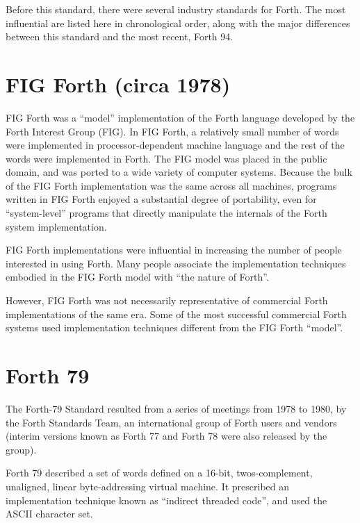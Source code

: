 \label{annex:diff}

Before this standard, there were several industry standards for Forth.
The most influential are listed here in chronological order, along
with the major differences between this standard and the most recent,
Forth 94.

\section{FIG Forth (circa 1978)} %

FIG Forth was a ``model'' implementation of the Forth language
developed by the Forth Interest Group (FIG). In FIG Forth, a
relatively small number of words were implemented in processor-dependent
machine language and the rest of the words were implemented in Forth.
The FIG model was placed in the public domain, and was ported to a wide
variety of computer systems. Because the bulk of the FIG Forth
implementation was the same across all machines, programs written in
FIG Forth enjoyed a substantial degree of portability, even for
``system-level'' programs that directly manipulate the internals
of the Forth system implementation.

FIG Forth implementations were influential in increasing the number
of people interested in using Forth. Many people associate the
implementation techniques embodied in the FIG Forth model with
``the nature of Forth''.

However, FIG Forth was not necessarily representative of commercial
Forth implementations of the same era. Some of the most successful
commercial Forth systems used implementation techniques different
from the FIG Forth ``model''.


\section{Forth 79} %

The Forth-79 Standard resulted from a series of meetings from 1978
to 1980, by the Forth Standards Team, an international group of Forth
users and vendors (interim versions known as Forth 77 and Forth 78
were also released by the group).

Forth 79 described a set of words defined on a 16-bit, twos-complement,
unaligned, linear byte-addressing virtual machine. It prescribed an
implementation technique known as ``indirect threaded code'', and used
the ASCII character set.

